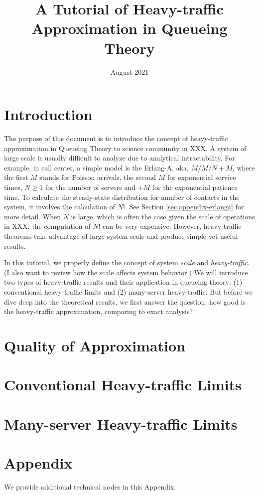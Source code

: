 \documentclass{article}
\title{A Tutorial of Heavy-traffic Approximation in Queueing Theory}
\author{}
\date{August 2021}
\begin{document}
\maketitle

\section{Introduction}
The purpose of this document is to introduce the concept of heavy-traffic approximation in Queueing Theory to science community in XXX. A system of large scale is usually difficult to analyze due to analytical intractability. For example, in call center, a simple model is the Erlang-A, aka, $M/M/N+M$, where the first $M$ stands for Poisson arrivals, the second $M$ for exponential service times, $N\geq 1$ for the number of servers and $+M$ for the exponential patience time. To calculate the steady-state distribution for number of contacts in the system, it involves the calculation of $N!$. See Section \ref{sec:appendix-erlanga} for more detail. When $N$ is large, which is often the case given the scale of operations in XXX, the computation of $N!$ can be very expensive. However, heavy-traffic theorems take advantage of large system scale and produce simple yet useful results. 

In this tutorial, we properly define the concept of system \textit{scale} and \textit{heavy-traffic}. (I also want to review how the scale affects system behavior.) We will introduce two types of heavy-traffic results and their application in queueing theory: (1) conventional heavy-traffic limits and (2) many-server heavy-traffic.  But before we dive deep into the theoretical results, we first answer the question: how good is the heavy-traffic approximation, comparing to exact analysis? 

\section{Quality of Approximation}

\section{Conventional Heavy-traffic Limits}

\section{Many-server Heavy-traffic Limits}

\section{Appendix}
We provide additional technical nodes in this Appendix. 
\end{document}
